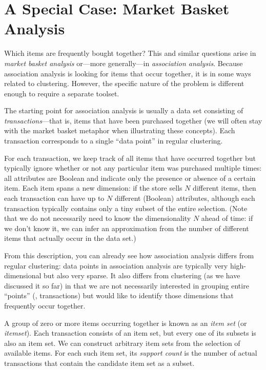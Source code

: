 
\section{A Special Case: Market Basket Analysis}

  
Which items are frequently bought together? This and similar questions
arise in \emph{market basket analysis} or---more generally---in
\emph{association analysis}. Because association analysis is looking
for items that occur together, it is in some ways related to
clustering. However, the specific nature of the problem is different
enough to require a separate toolset.

The starting point for association analysis is usually a data set
consisting of \emph{transactions}---\break that is, items that have been
purchased together (we will often stay with the market basket metaphor
when illustrating these concepts). Each transaction corresponds to a
single ``data point'' in regular clustering.

For each transaction, we keep track of all items that have occurred
together but typically ignore whether or not any particular item was
purchased multiple times: all attributes are Boolean and indicate only
the presence or absence of a certain item.  Each item spans a new
dimension: if the store sells $N$ different items, then each
transaction can have up to $N$ different (Boolean) attributes,
although each transaction typically contains only a tiny subset of the
entire selection. (Note that we do not necessarily need to know the
dimensionality $N$ ahead of time: if we don't know it, we can infer an
approximation from the number of different items that actually occur
in the data set.)

From this description, you can already see how association analysis
differs from regular clustering: data points in association analysis
are typically very high-dimensional but also very sparse.  It also
differs from clustering (as we have discussed it so far) in that we
are not necessarily interested in grouping entire ``points'' (\ie,
transactions) but would like to identify those dimensions that
frequently occur together.

A group of zero or more items occurring together is known as an
\emph{item set}  (or \emph{itemset}). Each transaction consists of an
item set, but every one of its subsets is also an item set. We can
construct arbitrary item sets from the selection of available items.
For each such item set, its \emph{support count}  is the number of
actual transactions that contain the candidate item set as a subset.

